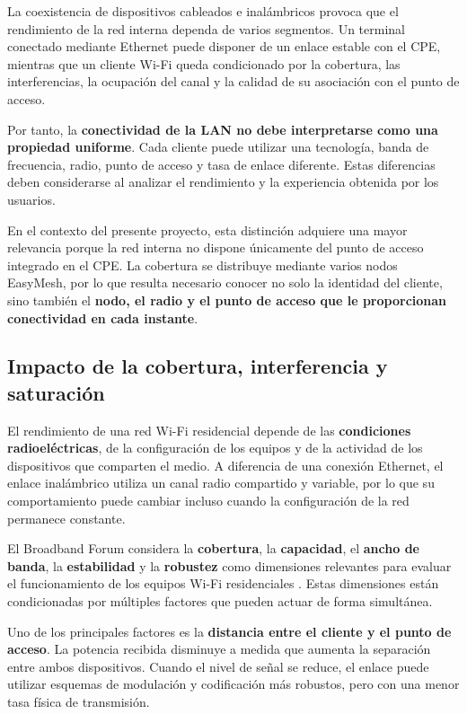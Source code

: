 La coexistencia de dispositivos cableados e inalámbricos provoca que el
rendimiento de la red interna dependa de varios segmentos. Un terminal
conectado mediante Ethernet puede disponer de un enlace estable con el
CPE, mientras que un cliente Wi-Fi queda condicionado por la cobertura,
las interferencias, la ocupación del canal y la calidad de su asociación
con el punto de acceso.

Por tanto, la \textbf{conectividad de la LAN no debe interpretarse como
una propiedad uniforme}. Cada cliente puede utilizar una tecnología,
banda de frecuencia, radio, punto de acceso y tasa de enlace diferente.
Estas diferencias deben considerarse al analizar el rendimiento y la
experiencia obtenida por los usuarios.

En el contexto del presente proyecto, esta distinción adquiere una mayor
relevancia porque la red interna no dispone únicamente del punto de
acceso integrado en el CPE. La cobertura se distribuye mediante varios
nodos EasyMesh, por lo que resulta necesario conocer no solo la identidad
del cliente, sino también el \textbf{nodo, el radio y el punto de acceso
que le proporcionan conectividad en cada instante}.

\subsection{Impacto de la cobertura, interferencia y saturación}
\label{subsec:impacto-cobertura-interferencia-saturacion}

El rendimiento de una red Wi-Fi residencial depende de las
\textbf{condiciones radioeléctricas}, de la configuración de los equipos
y de la actividad de los dispositivos que comparten el medio. A
diferencia de una conexión Ethernet, el enlace inalámbrico utiliza un
canal radio compartido y variable, por lo que su comportamiento puede
cambiar incluso cuando la configuración de la red permanece constante.

El Broadband Forum considera la \textbf{cobertura}, la
\textbf{capacidad}, el \textbf{ancho de banda}, la
\textbf{estabilidad} y la \textbf{robustez} como dimensiones relevantes
para evaluar el funcionamiento de los equipos Wi-Fi residenciales
\cite{bbf_tr398_i3c1}. Estas dimensiones están condicionadas por
múltiples factores que pueden actuar de forma simultánea.

Uno de los principales factores es la \textbf{distancia entre el cliente
y el punto de acceso}. La potencia recibida disminuye a medida que
aumenta la separación entre ambos dispositivos. Cuando el nivel de señal
se reduce, el enlace puede utilizar esquemas de modulación y codificación
más robustos, pero con una menor tasa física de transmisión.

